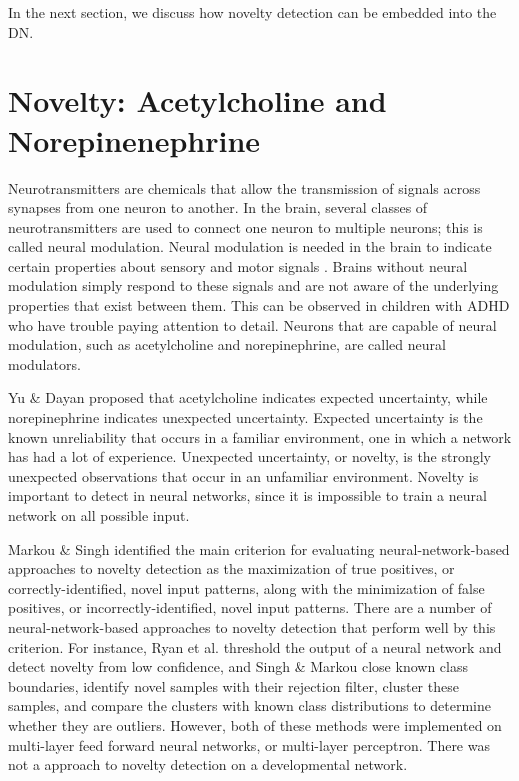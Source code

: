 \documentclass[conference]{IEEEtran}
\begin{document}
In the next section, we discuss how novelty detection can be embedded into the DN. 

\section{Novelty: Acetylcholine and Norepinenephrine}
Neurotransmitters are chemicals that allow the transmission of signals across synapses from one neuron to another. In the brain, several classes of neurotransmitters are used to connect one neuron to multiple neurons; this is called neural modulation. Neural modulation is needed in the brain to indicate certain properties about
sensory and motor signals \cite{WengNAI12}. Brains without neural modulation simply
respond to these signals and are not aware of the underlying properties that exist between them. This can be observed in children with ADHD who have trouble paying attention to detail. Neurons that are capable of neural modulation, such as acetylcholine and norepinephrine, are called neural modulators.

Yu \& Dayan \cite{Yu05} proposed that acetylcholine indicates expected uncertainty, while norepinephrine indicates unexpected uncertainty. Expected uncertainty is the known unreliability that occurs in a familiar environment, one in which a network has had a lot of experience. Unexpected uncertainty, or novelty, is the strongly unexpected observations that occur in an unfamiliar environment. Novelty is important to detect in neural networks, since it is impossible to train a neural network on all possible input.

Markou \& Singh \cite{Markou03} identified the main criterion for evaluating neural-network-based approaches to novelty detection as the maximization of true positives, or correctly-identified, novel input patterns, along with the minimization of false positives, or incorrectly-identified, novel input patterns. There are a number of neural-network-based approaches to novelty detection that perform well by this criterion. For instance, Ryan et al. \cite{Ryan98} threshold the output of a neural network and detect novelty from low confidence, and Singh \& Markou \cite{Singh04} close known class boundaries, identify novel samples with their rejection filter, cluster these samples, and compare the clusters with known class distributions to determine whether they are outliers. However, both of these methods were implemented on multi-layer feed forward neural networks, or multi-layer perceptron. There was not a approach to novelty detection on a developmental network.
\end{document}

